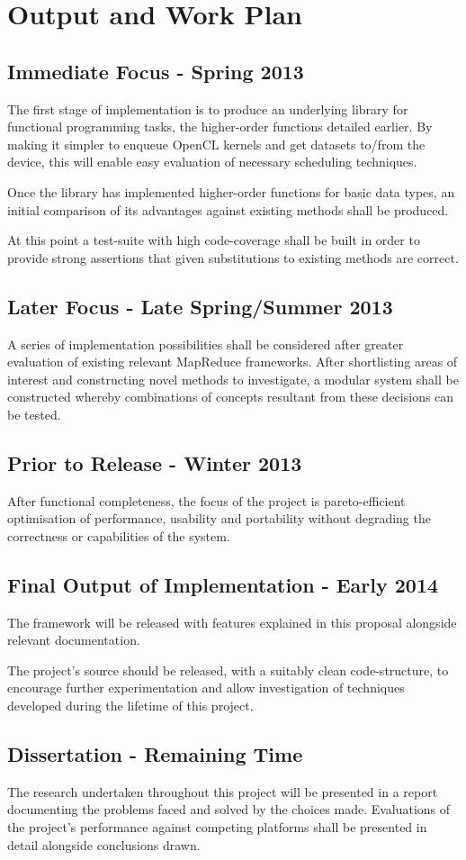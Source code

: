 \section{Output and Work Plan}
\subsection{Immediate Focus - Spring 2013}
The first stage of implementation is to produce an underlying library for functional programming tasks, the higher-order functions detailed earlier.
By making it simpler to enqueue OpenCL kernels and get datasets to/from the device, this will enable easy evaluation of necessary scheduling techniques.

Once the library has implemented higher-order functions for basic data types, an initial comparison of its advantages against existing methods shall be produced.

At this point a test-suite with high code-coverage shall be built in order to provide strong assertions that given substitutions to existing methods are correct.
\subsection{Later Focus - Late Spring/Summer 2013}
A series of implementation possibilities shall be considered after greater evaluation of existing relevant MapReduce frameworks. After shortlisting areas of interest and constructing novel methods to investigate, a modular system shall be constructed whereby combinations of concepts resultant from these decisions can be tested.
\subsection{Prior to Release - Winter 2013}
After functional completeness, the focus of the project is pareto-efficient optimisation of performance, usability and portability without degrading the correctness or capabilities of the system.
\subsection{Final Output of Implementation - Early 2014}
The framework will be released with features explained in this proposal alongside relevant documentation.

The project's source should be released, with a suitably clean code-structure, to encourage further experimentation and allow investigation of techniques developed during the lifetime of this project.

\subsection{Dissertation - Remaining Time}
The research undertaken throughout this project will be presented in a report documenting the problems faced and solved by the choices made. Evaluations of the project's performance against competing platforms shall be presented in detail alongside conclusions drawn.

